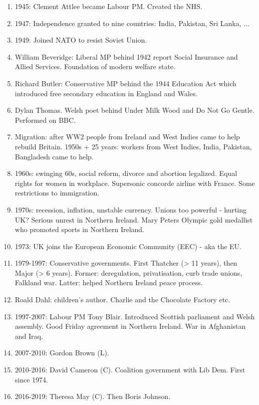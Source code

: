 \documentclass[10pt,reqno]{amsart}
\begin{document}
\begin{enumerate}[i]
\item 1945: Clement Attlee became Labour PM. Created the NHS. 
\item 1947: Independence granted to nine countries: India, Pakistan, Sri Lanka, ...
\item 1949: Joined NATO to resist Soviet Union. 
\item William Beveridge: Liberal MP behind 1942 report Social Insurance and Allied Services. Foundation of modern welfare state.
\item Richard Butler: Conservative MP behind the 1944 Education Act which introduced free secondary education in England and Wales. 
\item Dylan Thomas. Welsh poet behind Under Milk Wood and Do Not Go Gentle. Performed on BBC. 
\item Migration: after WW2 people from Ireland and West Indies came to help rebuild Britain.
1950s + 25 years: workers from West Indies, India, Pakistan, Bangladesh came to help. 
\item 1960s: swinging 60s, social reform, divorce and abortion legalized. Equal rights for women in workplace. Supersonic concorde airline with France. Some restrictions to immigration. 
\item 1970s: recession, inflation, unstable currency. Unions too powerful - hurting UK? Serious unrest in Northern Ireland. 
Mary Peters Olympic gold medallist who promoted sports in Northern Ireland. 
\item 1973: UK joins the European Economic Community (EEC) - aka the EU. 
\item 1979-1997: Conservative governments. First Thatcher (> 11 years), then Major (> 6 years). Former: deregulation, privatisation, curb trade unions, Falkland war. Latter: helped Northern Ireland peace process. 
\item Roald Dahl: children's author. Charlie and the Chocolate Factory etc. 
\item 1997-2007: Labour PM Tony Blair. Introduced Scottish parliament and Welsh assembly. Good Friday agreement in Northern Ireland. War in Afghanistan and Iraq. 
\item 2007-2010: Gordon Brown (L).
\item 2010-2016: David Cameron (C). Coalition government with Lib Dem. First since 1974. 
\item 2016-2019: Theresa May (C). Then Boris Johnson. 
\end{enumerate}
\end{document}
